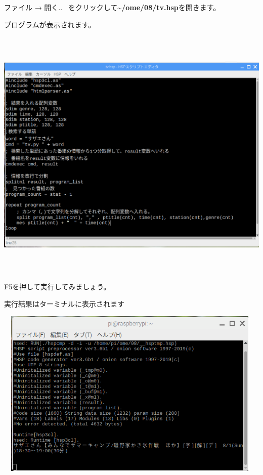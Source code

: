 \documentclass[a4paper,12pt,dvipdfmx]{jarticle}
\begin{document}
ファイル → 開く..
\ をクリックして\textbf{\~{}/ome/08/tv.hsp}を開きます。

プログラムが表示されます。



\begin{center}
\includegraphics[width=15.284cm,height=12.345cm]{textbook-img043.png}

\end{center}


\bigskip


\bigskip

F5を押して実行してみましょう。

実行結果はターミナルに表示されます



\begin{center}
\includegraphics[width=13.157cm,height=8.102cm]{textbook-img044.png}

\end{center}
\end{document}
